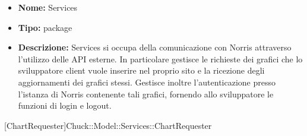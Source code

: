 			\begin{itemize}
			\item \textbf{Nome:} Services
			\item \textbf{Tipo:} package
			
			\item \textbf{Descrizione:} Services si occupa della comunicazione con Norris attraverso l’utilizzo delle API esterne. In particolare gestisce le richieste dei grafici che lo sviluppatore client vuole inserire nel proprio sito e la ricezione degli aggiornamenti dei grafici stessi. Gestisce inoltre l’autenticazione presso l’istanza di Norris contenente tali grafici, fornendo allo sviluppatore le funzioni di login e logout.
			\end{itemize}

			
			[ChartRequester]{Chuck::Model::Services::ChartRequester}
			

	
